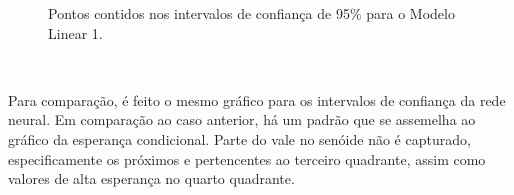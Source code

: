 \documentclass[
  a4paperpaper,
]{article}
\begin{document}
\begin{figure}[H]


\caption{\label{fig-intervaloconfianca}Pontos contidos nos intervalos de
confiança de 95\% para o Modelo Linear 1.}

\end{figure}%

~

Para comparação, é feito o mesmo gráfico para os intervalos de confiança
da rede neural. Em comparação ao caso anterior, há um padrão que se
assemelha ao gráfico da esperança condicional. Parte do vale no senóide
não é capturado, especificamente os próximos e pertencentes ao terceiro
quadrante, assim como valores de alta esperança no quarto quadrante.
\end{document}
